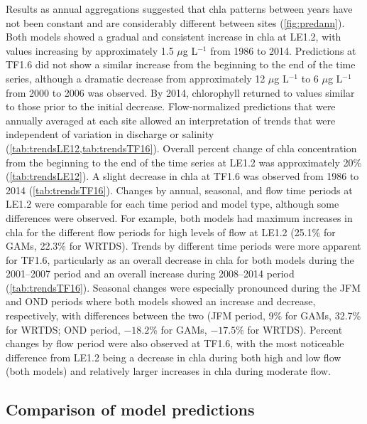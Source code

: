 \documentclass[letterpaper,12pt,oneside]{article}\usepackage[]{graphicx}\usepackage[]{color}
\newcommand{\mugl}{$\mu$g L$^{-1}$ }
\begin{document}
Results as annual aggregations suggested that \ac{chla} patterns between years have not been constant and are considerably different between sites (\cref{fig:predann}).  Both models showed a gradual and consistent increase in \ac{chla} at LE1.2, with values increasing by approximately 1.5 \mugl from 1986 to 2014.  Predictions at TF1.6 did not show a similar increase from the beginning to the end of the time series, although a dramatic decrease from approximately 12 \mugl to 6 \mugl from 2000 to 2006 was observed. By 2014, chlorophyll returned to values similar to those prior to the initial decrease.  Flow-normalized predictions that were annually averaged at each site allowed an interpretation of trends that were independent of variation in discharge or salinity (\cref{tab:trendsLE12,tab:trendsTF16}).  Overall percent change of \ac{chla} concentration from the beginning to the end of the time series at LE1.2 was approximately 20\% (\cref{tab:trendsLE12}).  A slight decrease in \ac{chla} at TF1.6 was observed from 1986 to 2014 (\cref{tab:trendsTF16}).  Changes by annual, seasonal, and flow time periods at LE1.2 were comparable for each time period and model type, although some differences were observed.  For example, both models had maximum increases in \ac{chla} for the different flow periods for high levels of flow at LE1.2 (25.1\% for \acp{GAM}, 22.3\% for \ac{WRTDS}).  Trends by different time periods were more apparent for TF1.6, particularly as an overall decrease in \ac{chla} for both models during the 2001--2007 period and an overall increase during 2008--2014 period (\cref{tab:trendsTF16}).  Seasonal changes were especially pronounced during the \ac{JFM} and \ac{OND} periods where both models showed an increase and decrease, respectively, with differences between the two (\ac{JFM} period, 9\% for \acp{GAM}, 32.7\% for \ac{WRTDS}; \ac{OND} period, \ensuremath{-18.2}\% for \acp{GAM}, \ensuremath{-17.5}\% for \ac{WRTDS}).  Percent changes by flow period were also observed at TF1.6, with the most noticeable difference from LE1.2 being a decrease in \ac{chla} during both high and low flow (both models) and relatively larger increases in \ac{chla} during moderate flow.  

\subsection{Comparison of model predictions}
\end{document}
